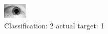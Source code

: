 \begin{figure}[h!]
\begin{center}
\includegraphics[width=0.60\columnwidth]{figures/ID1527_class_2_target_1.png}
\end{center}
\caption{ Classification: 2 actual target: 1}
\label{fig:ID1527_class_2_target_1}
\end{figure}
